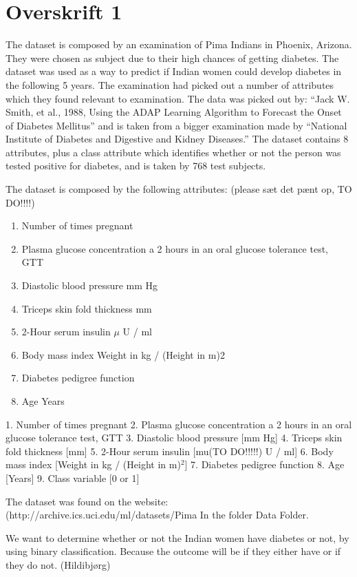 \section{Overskrift 1}

The dataset is composed by an examination of Pima Indians in Phoenix, Arizona.
They were chosen as subject due to their high chances of getting diabetes.
The dataset was used as a way to predict if Indian women could develop diabetes in the following 5 years.
The examination had picked out a number of attributes which they found relevant to examination.
The data was picked out by: “Jack W. Smith, et al., 1988, Using the ADAP Learning Algorithm to Forecast the Onset of Diabetes Mellitus”
and is taken from a bigger examination made by “National Institute of Diabetes and Digestive and Kidney Diseases.”
The dataset contains 8 attributes, plus a class attribute which identifies whether or not the person was tested positive for diabetes, and is taken by 768 test subjects.

The dataset is composed by the following attributes:
(please sæt det pænt op, TO DO!!!!)
\begin{enumerate}
\item Number of times pregnant
\item Plasma glucose concentration a 2 hours in an oral glucose tolerance test, GTT
\item Diastolic blood pressure mm Hg
\item Triceps skin fold thickness mm
\item 2-Hour serum insulin $\mu$ U / ml
\item Body mass index Weight in kg / (Height in m)2
\item Diabetes pedigree function
\item Age Years
\end{enumerate}

1. Number of times pregnant
2. Plasma glucose concentration a 2 hours in an oral glucose tolerance test, GTT
3. Diastolic blood pressure [mm Hg]
4. Triceps skin fold thickness [mm]
5. 2-Hour serum insulin [mu(TO DO!!!!!) U / ml]
6. Body mass index [Weight in kg / (Height in m)$^2$]
7. Diabetes pedigree function
8. Age [Years]
9. Class variable [0 or 1]

The dataset was found on the website: (http://archive.ics.uci.edu/ml/datasets/Pima%
In the folder Data Folder.

We want to determine whether or not the Indian women have diabetes or not, by using binary classification.
Because the outcome will be if they either have or if they do not.
(Hildibjørg)

